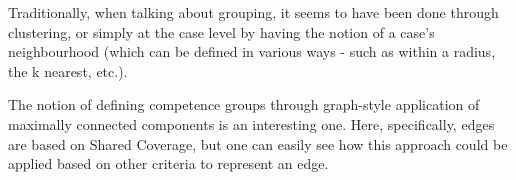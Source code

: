 \documentclass[a4paper,11pt]{report}
\begin{document}
Traditionally, when talking about grouping, it seems to have been done through clustering, or simply at the case level by having the notion of a case's neighbourhood (which can be defined in various ways - such as within a radius, the k nearest, etc.).

The notion of defining competence groups through graph-style application of maximally connected components is an interesting one. Here, specifically, edges are based on Shared Coverage, but one can easily see how this approach could be applied based on other criteria to represent an edge.



\end{document}
